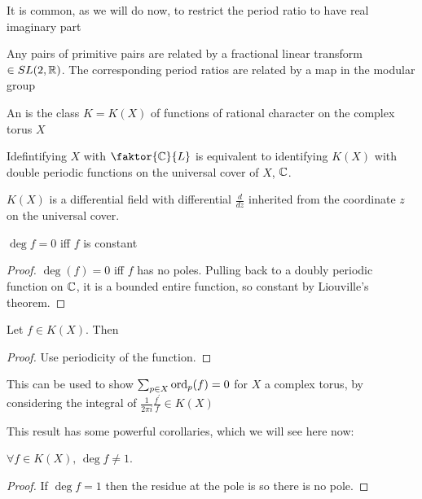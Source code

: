 \documentclass{article}
\begin{document}
It is common, as we will do now, to restrict the period ratio to have real imaginary part

\begin{prop}
	Any pairs of primitive pairs are related by a fractional linear transform $\in SL(2,\mathbb{R})$. The corresponding period ratios are related by a map in the modular group
\end{prop}

\begin{definition}
	An  is the class $K =K(X)$ of functions of rational character on the complex torus $X$
\end{definition}

\begin{remark}
	Idefintifying $X$ with $\faktor{\mbb{C}}{L}$ is equivalent to identifying $K(X)$ with double periodic functions on the universal cover of $X$, $\mathbb{C}$.
\end{remark}

\begin{prop}
	$K(X)$ is a differential field with differential $\frac{d}{dz}$ inherited from the coordinate $z$ on the universal cover.  
\end{prop}

\begin{prop}
$\deg f = 0$ iff $f$ is constant
\end{prop}
\begin{proof}
	$\deg(f) = 0$ iff $f$ has no poles. Pulling back to a doubly periodic function on $\mathbb{C}$, it is a bounded entire function, so constant by Liouville's theorem. 
\end{proof}

\begin{lemma}
	Let $f \in K(X)$. Then 
\end{lemma}
\begin{proof}
	Use periodicity of the function. 
\end{proof}

\begin{remark}
	This can be used to show $\sum_{p\in X} \operatorname{ord}_p(f)=0$ for $X$ a complex torus, by considering the integral of $\frac{1}{2\pi i}\frac{f^\prime}{f} \in K(X)$
\end{remark}

This result has some powerful corollaries, which we will see here now:

\begin{prop}
	$\forall f \in K(X), \, \deg f \neq 1$.
\end{prop}
\begin{proof}
	If $\deg f = 1$ then the residue at the pole is 
so there is no pole. 
\end{proof}
\end{document}
